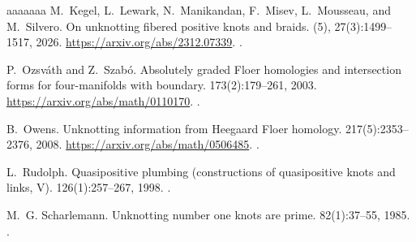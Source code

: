 \documentclass[a4paper,11pt]{amsart}
\numberwithin{equation}{subsection}
\theoremstyle{plain}
\theoremstyle{remark}
\begin{document}
\begin{thebibliography}{aaaaaaa}
M.~Kegel, L.~Lewark, N.~Manikandan, F.~Misev, L.~Mousseau, and M.~Silvero.
\newblock On unknotting fibered positive knots and braids.
 (5), 27(3):1499--1517, 2026.
\newblock \url{https://arxiv.org/abs/2312.07339}.
\newblock \href{https://doi.org/10.2422/2036-2145.202401_001}{}.

P.~Ozsv\'ath and Z.~Szab\'o.
\newblock Absolutely graded Floer homologies and intersection forms for four-manifolds with boundary.
 173(2):179--261, 2003.
\newblock \url{https://arxiv.org/abs/math/0110170}.
\newblock \href{https://doi.org/10.1016/S0001-8708(02)00030-0}{}.

B.~Owens.
\newblock Unknotting information from Heegaard Floer homology.
 217(5):2353--2376, 2008.
\newblock \url{https://arxiv.org/abs/math/0506485}.
\newblock \href{https://doi.org/10.1016/j.aim.2007.10.006}{}.

L.~Rudolph.
\newblock Quasipositive plumbing (constructions of quasipositive knots and links, V).
 126(1):257--267, 1998.
\newblock \href{https://doi.org/10.1090/S0002-9939-98-04407-4}{}.

M.~G. Scharlemann.
\newblock Unknotting number one knots are prime.
 82(1):37--55, 1985.
\newblock \href{https://doi.org/10.1007/BF01394778}{}.

\end{thebibliography}
\end{document}
